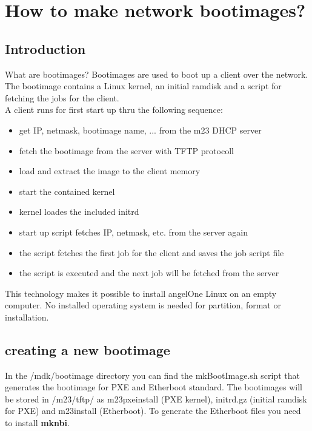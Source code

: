 \section{How to make network bootimages?}
\subsection{Introduction}
What are bootimages? Bootimages are used to boot up a client over the network. The bootimage contains a Linux kernel, an initial ramdisk and a script for fetching the jobs for the client.\\
A client runs for first start up thru the following sequence:\\
\begin{itemize}
\item get IP, netmask, bootimage name, ... from the m23 DHCP server
\item fetch the bootimage from the server with TFTP protocoll
\item load and extract the image to the client memory
\item start the contained kernel
\item kernel loades the included initrd
\item start up script fetches IP, netmask, etc. from the server again
\item the script fetches the first job for the client and saves the job script file
\item the script is executed and the next job will be fetched from the server
\end{itemize} 
This technology makes it possible to install angelOne Linux on an empty computer. No installed operating system is needed for partition, format or installation.
\subsection{creating a new bootimage}
In the /mdk/bootimage directory you can find the mkBootImage.sh script that generates the bootimage for PXE and Etherboot standard. The bootimages will be stored in /m23/tftp/ as m23pxeinstall (PXE kernel), initrd.gz (initial ramdisk for PXE) and m23install (Etherboot). To generate the Etherboot files you need to install \textbf{mknbi}.\\

